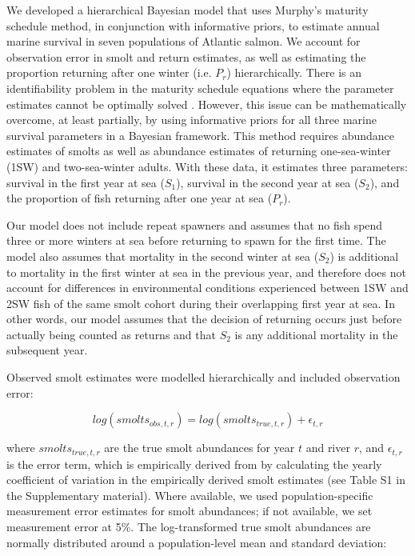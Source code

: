 \documentclass[12pt]{article}
\newcommand{\So}{$S_{1}$\xspace}
\newcommand{\St}{$S_{2}$\xspace}
\newcommand{\Pg}{$P_r$\xspace}
\newcommand{\comment}[1]{\par {\bfseries \color{blue} #1 \par}} %
\begin{document}
We developed a hierarchical Bayesian model that uses Murphy's maturity
schedule method, in conjunction with informative priors, to estimate annual
marine survival in seven populations of Atlantic salmon. We account for
observation error in smolt and return estimates, as well as estimating the
proportion returning after one winter (i.e. \Pg) hierarchically.
There is an identifiability problem in the maturity schedule equations where
the parameter estimates cannot be optimally solved \citep{Chaput2003a}.
However, this issue can be mathematically overcome, at least partially, by
using informative priors for all three marine survival parameters in a
Bayesian framework.
This method requires abundance estimates of smolts as well as abundance estimates
of returning one-sea-winter (1SW) and two-sea-winter adults. With these data,
it estimates three parameters: survival in the first year at sea (\So), survival
in the second year at sea (\St), and the proportion of fish returning after one
year at sea (\Pg). 

Our model does not include repeat spawners and assumes that no fish spend
three or more winters at sea before returning to spawn for the first time.
The model also assumes that mortality in the second winter at sea (\St)
is additional to mortality in the first winter at sea in the previous year, 
and therefore does not account for differences in environmental conditions experienced
between 1SW and 2SW fish of the same smolt cohort during their overlapping first year at sea.
In other words, our model assumes that the decision of returning occurs just before
actually being counted as returns and that \St is any additional mortality in
the subsequent year. 


Observed smolt estimates were modelled hierarchically and included
observation error:

\begin{equation}
log(smolts_{obs,t,r}) = log(smolts_{true,t,r}) + \epsilon_{t,r}
\end{equation}

where $smolts_{true,t,r}$ are the true smolt abundances for year $t$ and river
$r$, and $\epsilon_{t,r}$ is the error term, which is empirically derived from
by calculating the yearly coefficient of variation in the empirically derived
smolt estimates (see Table S1 in the Supplementary material). 
Where available, we used population-specific measurement error estimates for smolt abundances; if not 
available, we set measurement error at 5\%. 
The log-transformed true smolt abundances are
normally distributed around a population-level mean and standard deviation:
\end{document}
